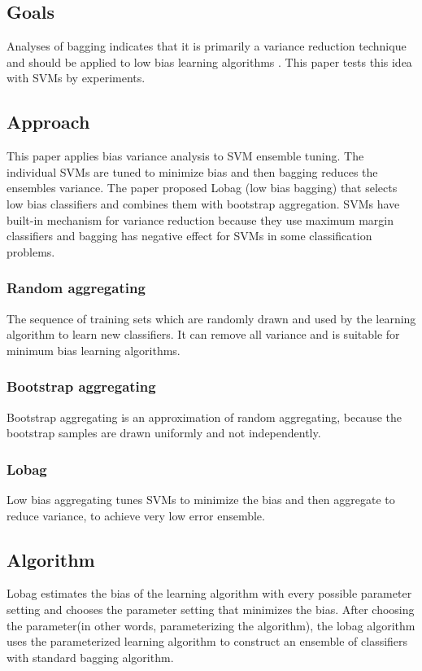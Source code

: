 \documentclass[12pt]{article}
\begin{document}
\subsection{Goals}
Analyses of bagging indicates that it is primarily a variance reduction technique and should be applied to low bias learning algorithms \cite{valentini2003low}. This paper tests this idea with SVMs by experiments.
\subsection{Approach}
This paper applies bias variance analysis to SVM ensemble tuning. The individual SVMs are tuned to minimize bias and then bagging reduces the ensembles variance. The paper proposed Lobag (low bias bagging) that selects low bias classifiers and combines them with bootstrap aggregation. SVMs have built-in mechanism for variance reduction because they use maximum margin classifiers and bagging has negative effect for SVMs in some classification problems.
\subsubsection{Random aggregating}
The sequence of training sets which are randomly drawn and used by the learning algorithm to learn new classifiers. It can remove all variance and is suitable for minimum bias learning algorithms.
\subsubsection{Bootstrap aggregating}
Bootstrap aggregating is an approximation of random aggregating, because the bootstrap samples are drawn uniformly and not independently.
\subsubsection{Lobag}
Low bias aggregating tunes SVMs to minimize the bias and then aggregate to reduce variance, to achieve very low error ensemble.
\subsection{Algorithm}
Lobag estimates the bias of the learning algorithm with every possible parameter setting and chooses the parameter setting that minimizes the bias. After choosing the parameter(in other words, parameterizing the algorithm), the lobag algorithm uses the parameterized learning algorithm to construct an ensemble of classifiers with standard bagging algorithm.
\end{document}
